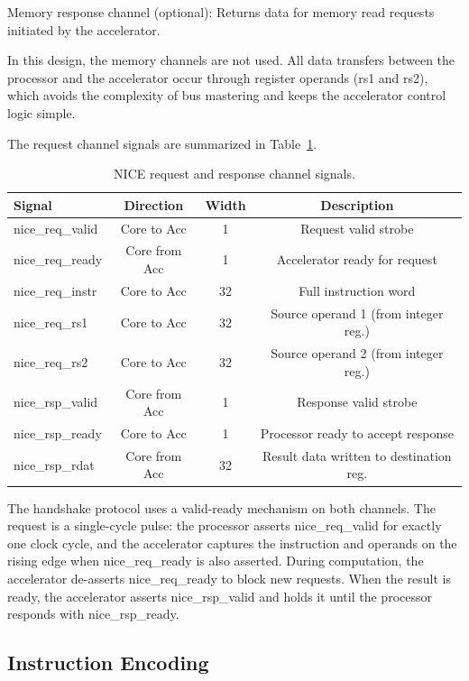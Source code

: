 Memory response channel (optional): Returns data for memory read requests initiated by the accelerator.

In this design, the memory channels are not used. All data transfers between the processor and the accelerator occur through register operands (rs1 and rs2), which avoids the complexity of bus mastering and keeps the accelerator control logic simple.

The request channel signals are summarized in Table~\ref{tab:3_2}.

\begin{table}[htbp]
\centering
\caption{NICE request and response channel signals.}
\label{tab:3_2}
\begin{tabular}{lccc}
\hline
Signal & Direction & Width & Description \\ \hline\hline
nice\_req\_valid & Core to Acc & 1 & Request valid strobe \\ \hline
nice\_req\_ready & Core from Acc & 1 & Accelerator ready for request \\ \hline
nice\_req\_instr & Core to Acc & 32 & Full instruction word \\ \hline
nice\_req\_rs1 & Core to Acc & 32 & Source operand 1 (from integer reg.) \\ \hline
nice\_req\_rs2 & Core to Acc & 32 & Source operand 2 (from integer reg.) \\ \hline
nice\_rsp\_valid & Core from Acc & 1 & Response valid strobe \\ \hline
nice\_rsp\_ready & Core to Acc & 1 & Processor ready to accept response \\ \hline
nice\_rsp\_rdat & Core from Acc & 32 & Result data written to destination reg. \\ \hline
\end{tabular}
\end{table}

The handshake protocol uses a valid-ready mechanism on both channels. The request is a single-cycle pulse: the processor asserts nice\_req\_valid for exactly one clock cycle, and the accelerator captures the instruction and operands on the rising edge when nice\_req\_ready is also asserted. During computation, the accelerator de-asserts nice\_req\_ready to block new requests. When the result is ready, the accelerator asserts nice\_rsp\_valid and holds it until the processor responds with nice\_rsp\_ready.

\subsection{Instruction Encoding}

